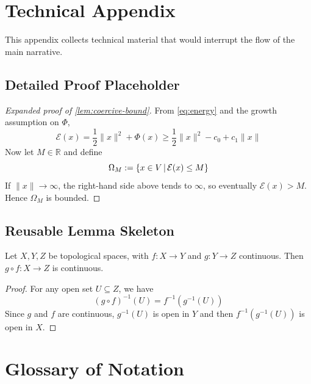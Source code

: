 \appendix

\section{Technical Appendix}
\label{sec:technical-appendix}

This appendix collects technical material that would interrupt the flow of the main narrative.

\subsection{Detailed Proof Placeholder}
\label{app:proof-coercive-bound}

\begin{proof}[Expanded proof of \cref{lem:coercive-bound}]
From \cref{eq:energy} and the growth assumption on $\Phi$,
\[
\mathcal{E}(x)=\frac12\|x\|^2+\Phi(x)
\ge \frac12\|x\|^2-c_0+c_1\|x\|
\]
Now let $M\in\mathbb{R}$ and define
\[
\Omega_M:=\left\{x\in V\,|\,\mathcal{E}(x)\le M\right\}
\]
If $\|x\|\to\infty$, the right-hand side above tends to $\infty$, so eventually $\mathcal{E}(x)>M$. Hence $\Omega_M$ is bounded.
\end{proof}

\subsection{Reusable Lemma Skeleton}
\label{app:lemma-skeleton}

\begin{lemma}
\label{lem:composition-template}
Let $X,Y,Z$ be topological spaces, with $f:X\to Y$ and $g:Y\to Z$ continuous. Then $g\circ f:X\to Z$ is continuous.
\end{lemma}

\begin{proof}
For any open set $U\subseteq Z$, we have
\[
(g\circ f)^{-1}(U)=f^{-1}(g^{-1}(U))
\]
Since $g$ and $f$ are continuous, $g^{-1}(U)$ is open in $Y$ and then $f^{-1}(g^{-1}(U))$ is open in $X$.
\end{proof}


\section{Glossary of Notation}
\label{sec:notation-appendix}


